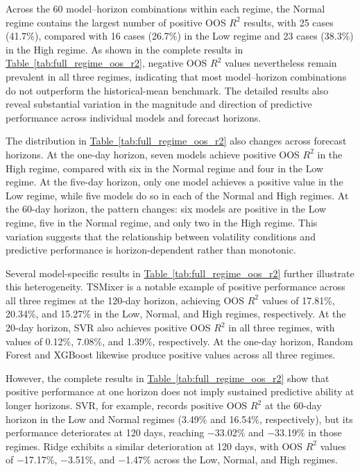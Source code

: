 \documentclass[12pt,twoside]{ord}
\begin{document}
Across the 60 model--horizon combinations within each regime, the Normal regime contains the largest number of positive OOS $R^2$ results, with 25 cases (41.7\%), compared with 16 cases (26.7\%) in the Low regime and 23 cases (38.3\%) in the High regime. As shown in the complete results in \hyperref[tab:full_regime_oos_r2]{Table~\ref*{tab:full_regime_oos_r2}}, negative OOS $R^2$ values nevertheless remain prevalent in all three regimes, indicating that most model--horizon combinations do not outperform the historical-mean benchmark. The detailed results also reveal substantial variation in the magnitude and direction of predictive performance across individual models and forecast horizons.

The distribution in \hyperref[tab:full_regime_oos_r2]{Table~\ref*{tab:full_regime_oos_r2}} also changes across forecast horizons. At the one-day horizon, seven models achieve positive OOS $R^2$ in the High regime, compared with six in the Normal regime and four in the Low regime. At the five-day horizon, only one model achieves a positive value in the Low regime, while five models do so in each of the Normal and High regimes. At the 60-day horizon, the pattern changes: six models are positive in the Low regime, five in the Normal regime, and only two in the High regime. This variation suggests that the relationship between volatility conditions and predictive performance is horizon-dependent rather than monotonic.

Several model-specific results in \hyperref[tab:full_regime_oos_r2]{Table~\ref*{tab:full_regime_oos_r2}} further illustrate this heterogeneity. TSMixer is a notable example of positive performance across all three regimes at the 120-day horizon, achieving OOS $R^2$ values of 17.81\%, 20.34\%, and 15.27\% in the Low, Normal, and High regimes, respectively. At the 20-day horizon, SVR also achieves positive OOS $R^2$ in all three regimes, with values of 0.12\%, 7.08\%, and 1.39\%, respectively. At the one-day horizon, Random Forest and XGBoost likewise produce positive values across all three regimes.

However, the complete results in \hyperref[tab:full_regime_oos_r2]{Table~\ref*{tab:full_regime_oos_r2}} show that positive performance at one horizon does not imply sustained predictive ability at longer horizons. SVR, for example, records positive OOS $R^2$ at the 60-day horizon in the Low and Normal regimes (3.49\% and 16.54\%, respectively), but its performance deteriorates at 120 days, reaching $-$33.02\% and $-$33.19\% in those regimes. Ridge exhibits a similar deterioration at 120 days, with OOS $R^2$ values of $-$17.17\%, $-$3.51\%, and $-$1.47\% across the Low, Normal, and High regimes.
\end{document}
